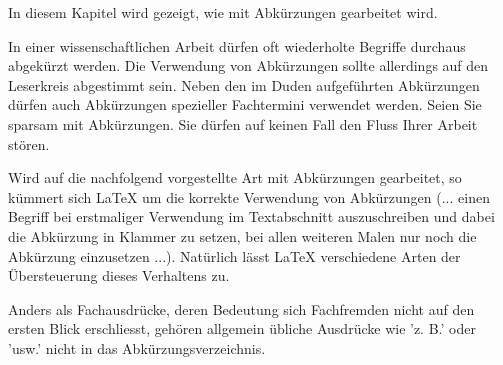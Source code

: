 In diesem Kapitel wird gezeigt, wie mit Abkürzungen gearbeitet wird.
\par
In einer wissenschaftlichen Arbeit dürfen oft wiederholte Begriffe durchaus abgekürzt werden. Die Verwendung von Abkürzungen sollte allerdings auf den Leserkreis abgestimmt sein. Neben den im Duden aufgeführten Abkürzungen dürfen auch Abkürzungen spezieller Fachtermini verwendet werden. Seien Sie sparsam mit Abkürzungen. Sie dürfen auf keinen Fall den Fluss Ihrer Arbeit stören.
\par
Wird auf die nachfolgend vorgestellte Art mit Abkürzungen gearbeitet, so kümmert sich LaTeX um die korrekte Verwendung von Abkürzungen (... einen Begriff bei erstmaliger Verwendung im Textabschnitt auszuschreiben und dabei die Abkürzung in Klammer zu setzen, bei allen weiteren Malen nur noch die Abkürzung einzusetzen ...). Natürlich lässt LaTeX verschiedene Arten der Übersteuerung dieses Verhaltens zu.
\par
Anders als Fachausdrücke, deren Bedeutung sich Fachfremden nicht auf den ersten Blick erschliesst, gehören allgemein übliche Ausdrücke wie 'z. B.' oder 'usw.' nicht in das Abkürzungsverzeichnis.
   